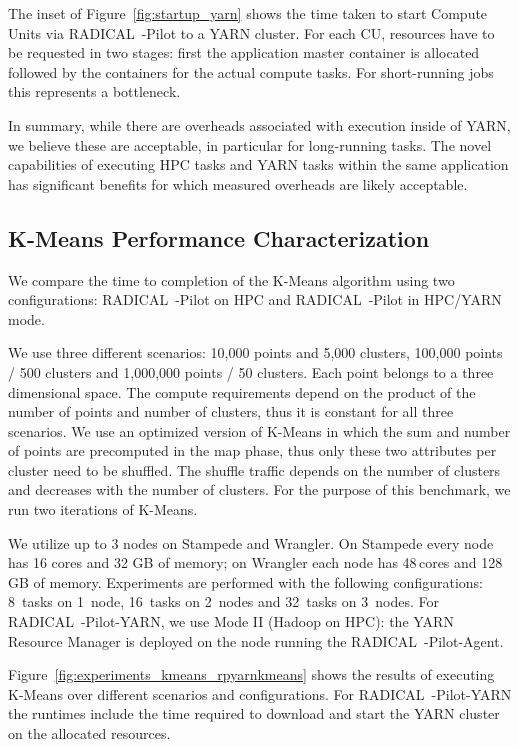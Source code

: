 The inset of Figure~\ref{fig:startup_yarn} shows the time taken to start Compute Units via RADICAL~-Pilot to a YARN cluster.
For each CU, resources have to be requested in two stages: first the application master container is allocated followed by the containers for the actual compute tasks.
For short-running jobs this represents a bottleneck.

In summary, while there are overheads associated with execution inside of YARN, we believe these are acceptable, in particular for long-running tasks.
The novel capabilities of executing HPC tasks and YARN tasks within the same application has significant benefits for which measured overheads are likely acceptable.

\subsection{K-Means Performance Characterization}
\label{ssec:kmeans}
We compare the time to completion of the K-Means algorithm using two configurations: RADICAL~-Pilot on HPC and RADICAL~-Pilot in HPC/YARN mode. 

We use three different scenarios: 10,000 points and 5,000 clusters, 100,000 points / 500 clusters and 1,000,000 points / 50 clusters.
Each point belongs to a three dimensional space.
The compute requirements depend on the product of the number of points and number of clusters, thus it is constant for all three scenarios.
We use an optimized version of K-Means in which the sum and number of points are precomputed in the map phase, thus only these two attributes per cluster need to be shuffled.
The shuffle traffic depends on the number of clusters and decreases with the number of clusters.
For the purpose of this benchmark, we run two iterations of K-Means.

We utilize up to 3 nodes on Stampede and Wrangler.
On Stampede every node has 16 cores and 32 GB of memory; on Wrangler each node has 48\,cores and 128\,GB of memory.
Experiments are performed with the following configurations: 8~tasks on 1~node, 16~tasks on 2~nodes and 32~tasks on 3~nodes.
For RADICAL~-Pilot-YARN, we use Mode II (Hadoop on HPC): the YARN Resource Manager is deployed on the node running the RADICAL~-Pilot-Agent.

Figure~\ref{fig:experiments_kmeans_rpyarnkmeans} shows the results of executing K-Means over different scenarios and configurations.
For RADICAL~-Pilot-YARN the runtimes include the time required to download and start the YARN cluster on the allocated resources.

